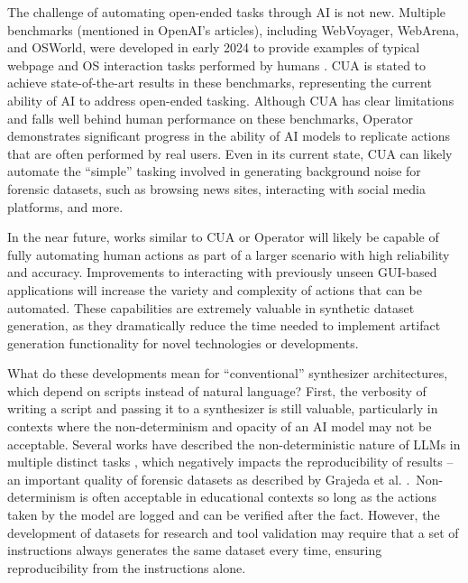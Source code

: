 The challenge of automating open-ended tasks through AI is not new.
Multiple benchmarks (mentioned in OpenAI's articles), including
WebVoyager, WebArena, and OSWorld, were developed in early 2024 to
provide examples of typical webpage and OS interaction tasks performed
by humans
\cite{zhouWebArenaRealisticWeb2024,heWebVoyagerBuildingEndtoEnd2024,xieOSWorldBenchmarkingMultimodal2024}.
CUA is stated to achieve state-of-the-art results in these benchmarks,
representing the current ability of AI to address open-ended tasking.
Although CUA has clear limitations and falls well behind human
performance on these benchmarks, Operator demonstrates significant
progress in the ability of AI models to replicate actions that are often
performed by real users. Even in its current state, CUA can likely
automate the ``simple'' tasking involved in generating background noise
for forensic datasets, such as browsing news sites, interacting with
social media platforms, and more.

In the near future, works similar to CUA or Operator will likely be
capable of fully automating human actions as part of a larger scenario
with high reliability and accuracy. Improvements to interacting with
previously unseen GUI-based applications will increase the variety and
complexity of actions that can be automated. These capabilities are
extremely valuable in synthetic dataset generation, as they dramatically
reduce the time needed to implement artifact generation functionality
for novel technologies or developments.

What do these developments mean for ``conventional'' synthesizer
architectures, which depend on scripts instead of natural language?
First, the verbosity of writing a script and passing it to a synthesizer
is still valuable, particularly in contexts where the non-determinism
and opacity of an AI model may not be acceptable. Several works have
described the non-deterministic nature of LLMs in multiple distinct
tasks
\cite{astekinExploratoryStudyHow2024,songGoodBadGreedy2024,ouyangEmpiricalStudyNonDeterminism2025},
which negatively impacts the reproducibility of results -- an important
quality of forensic datasets as described by Grajeda et al.
\cite{grajedaAvailabilityDatasetsDigital2017}.~Non-determinism is
often acceptable in educational contexts so long as the actions taken by
the model are logged and can be verified after the fact. However, the
development of datasets for research and tool validation may require
that a set of instructions always generates the same dataset every time,
ensuring reproducibility from the instructions alone.

